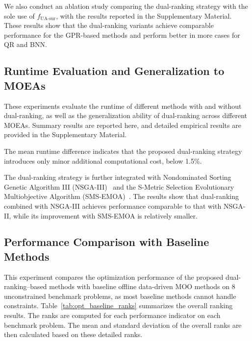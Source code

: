 \documentclass{article}
\begin{document}
We also conduct an ablation study comparing the dual-ranking strategy with the sole use of $f_{\text{UA-sur}}$, with the results reported in the Supplementary Material. These results show that the dual-ranking variants achieve comparable performance for the GPR-based methods and perform better in more cases for QR and BNN.

\subsection{Runtime Evaluation and Generalization to MOEAs} \label{sec:runtime}
These experiments evaluate the runtime of different methods with and without dual-ranking, as well as the generalization ability of dual-ranking across different MOEAs. Summary results are reported here, and detailed empirical results are provided in the Supplementary Material.

The mean runtime difference indicates that the proposed dual-ranking strategy introduces only minor additional computational cost, below 1.5\%.

The dual-ranking strategy is further integrated with Nondominated Sorting Genetic Algorithm III (NSGA-III)~\cite{nsga3} and the S-Metric Selection Evolutionary Multiobjective Algorithm (SMS-EMOA)~\cite{sms_emoa}. The results show that dual-ranking combined with NSGA-III achieves performance comparable to that with NSGA-II, while its improvement with SMS-EMOA is relatively smaller.

\subsection{Performance Comparison with Baseline Methods} \label{sec:results_baseline}
This experiment compares the optimization performance of the proposed dual-ranking–based methods with baseline offline data-driven MOO methods on 8 unconstrained benchmark problems, as most baseline methods cannot handle constraints. Table~\ref{tab:opt_baseline_ranks} summarizes the overall ranking results. The ranks are computed for each performance indicator on each benchmark problem. The mean and standard deviation of the overall ranks are then calculated based on these detailed ranks.
\end{document}
